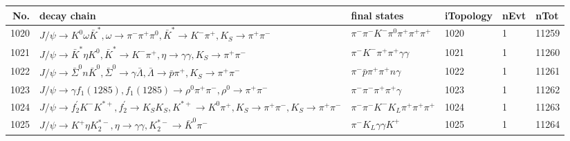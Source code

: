 \begin{table}[htbp] 
\begin{center}
\begin{small}
\begin{tabular}{rlllll}\hline\hline
 No. & decay chain & final states &  iTopology & nEvt & nTot \\\hline
1020&$J/\psi       \rightarrow K^{0}          \omega         \bar{K}^{*}   , \omega          \rightarrow \pi^{-}        \pi^{+}        \pi^{0}        , \bar{K}^{*}    \rightarrow K^{-}          \pi^{+}        , K_{S}           \rightarrow \pi^{+}        \pi^{-}        $&$\pi^{-}        \pi^{-}        K^{-}          \pi^{0}        \pi^{+}        \pi^{+}        \pi^{+}        $& 1020&    1&11259\\
1021&$J/\psi       \rightarrow \bar{K}^{*}   \eta          K^{0}          , \bar{K}^{*}    \rightarrow K^{-}          \pi^{+}        , \eta           \rightarrow \gamma       \gamma       , K_{S}           \rightarrow \pi^{+}        \pi^{-}        $&$\pi^{-}        K^{-}          \pi^{+}        \pi^{+}        \gamma       \gamma       $& 1021&    1&11260\\
1022&$J/\psi       \rightarrow \bar{\Sigma}^0   n                 \bar{K}^{0}   , \bar{\Sigma}^0    \rightarrow \gamma       \bar{\Lambda}    , \bar{\Lambda}     \rightarrow \bar{p}          \pi^{+}        , K_{S}           \rightarrow \pi^{+}        \pi^{-}        $&$\pi^{-}        \bar{p}          \pi^{+}        \pi^{+}        n                 \gamma       $& 1022&    1&11261\\
1023&$J/\psi       \rightarrow \gamma       f_{1}(1285)    , f_{1}(1285)     \rightarrow \rho^{0}      \pi^{+}        \pi^{-}        , \rho^{0}       \rightarrow \pi^{+}        \pi^{-}        $&$\pi^{-}        \pi^{-}        \pi^{+}        \pi^{+}        \gamma       $& 1023&    1&11262\\
1024&$J/\psi       \rightarrow f_2^{'}       K^{-}          K^{*+}         , f_2^{'}        \rightarrow K_{S}          K_{S}          , K^{*+}          \rightarrow K^{0}          \pi^{+}        , K_{S}           \rightarrow \pi^{+}        \pi^{-}        , K_{S}           \rightarrow \pi^{+}        \pi^{-}        $&$\pi^{-}        \pi^{-}        K^{-}          K_{L}          \pi^{+}        \pi^{+}        \pi^{+}        $& 1024&    1&11263\\
1025&$J/\psi       \rightarrow K^{+}          \eta          K_2^{*-}       , \eta           \rightarrow \gamma       \gamma       , K_2^{*-}        \rightarrow \bar{K}^{0}   \pi^{-}        $&$\pi^{-}        K_{L}          \gamma       \gamma       K^{+}          $& 1025&    1&11264\\

\end{tabular}
\end{small}
\end{center}
\end{table}
